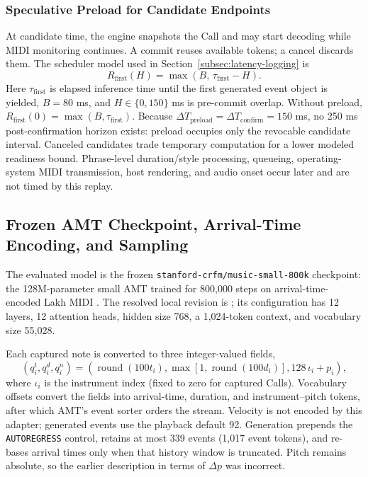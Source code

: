 \documentclass[11pt,a4paper]{article}
\begin{document}
\subsubsection{Speculative Preload for Candidate Endpoints}
\label{sec:speculative-preload}

At candidate time, the engine snapshots the Call and may start decoding while MIDI monitoring continues. A commit reuses available tokens; a cancel discards them. The scheduler model used in Section~\ref{subsec:latency-logging} is
\begin{equation}
R_{\mathrm{first}}(H)
=
\max\left(
B,\,
\tau_{\mathrm{first}}-H
\right).
\label{eq:perceived-latency-preload}
\end{equation}
Here $\tau_{\mathrm{first}}$ is elapsed inference time until the first generated event object is yielded, $B=80$ ms, and $H\in\{0,150\}$ ms is pre-commit overlap. Without preload, $R_{\mathrm{first}}(0)=\max(B,\tau_{\mathrm{first}})$. Because $\Delta T_{\mathrm{preload}}=\Delta T_{\mathrm{confirm}}=150$ ms, no 250 ms post-confirmation horizon exists: preload occupies only the revocable candidate interval. Canceled candidates trade temporary computation for a lower modeled readiness bound. Phrase-level duration/style processing, queueing, operating-system MIDI transmission, host rendering, and audio onset occur later and are not timed by this replay.

\subsection{Frozen AMT Checkpoint, Arrival-Time Encoding, and Sampling}
\label{sec:relative-interval-nucleus-sampling}

The evaluated model is the frozen \texttt{stanford-crfm/music-small-800k} checkpoint: the 128M-parameter small AMT trained for 800,000 steps on arrival-time-encoded Lakh MIDI \citep{stanfordcrfm2023musicsmall,thickstun2023amt}. The resolved local revision is ; its configuration has 12 layers, 12 attention heads, hidden size 768, a 1,024-token context, and vocabulary size 55,028.

Each captured note is converted to three integer-valued fields,
\begin{equation}
\left(
q_i^{t},q_i^{d},q_i^{n}
\right)
=
\left(
\operatorname{round}(100t_i),
\max[1,\operatorname{round}(100d_i)],
128\,\iota_i+p_i
\right),
\label{eq:relative-arrival-time}
\end{equation}
where $\iota_i$ is the instrument index (fixed to zero for captured Calls). Vocabulary offsets convert the fields into arrival-time, duration, and instrument--pitch tokens, after which AMT's event sorter orders the stream. Velocity is not encoded by this adapter; generated events use the playback default 92. Generation prepends the \texttt{AUTOREGRESS} control, retains at most 339 events (1,017 event tokens), and re-bases arrival times only when that history window is truncated. Pitch remains absolute, so the earlier description in terms of $\Delta p$ was incorrect.
\end{document}
